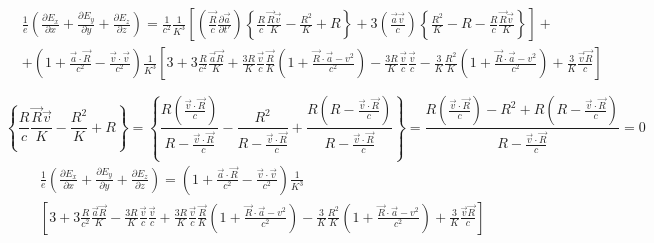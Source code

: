 \documentclass[11pt]{article}
\begin{document}
\[\begin{align}
  & \frac{1}{e}\left( \frac{\partial {{E}_{x}}}{\partial x}+\frac{\partial {{E}_{y}}}{\partial y}+\frac{\partial {{E}_{z}}}{\partial z} \right)=\frac{1}{{{c}^{2}}}\frac{1}{{{K}^{3}}}\left[ \left( \frac{\overrightarrow{R}}{c}\frac{\partial \overrightarrow{a}}{\partial t'} \right)\left\{ \frac{R}{c}\frac{\overrightarrow{R}\overrightarrow{v}}{K}-\frac{{{R}^{2}}}{K}+R \right\}+3\left( \frac{\overrightarrow{a}\overrightarrow{v}}{c} \right)\left\{ \frac{{{R}^{2}}}{K}-R-\frac{R}{c}\frac{\overrightarrow{R}\overrightarrow{v}}{K} \right\} \right]+ \\ 
 & +\left( 1+\frac{\overrightarrow{a}\cdot \overrightarrow{R}}{{{c}^{2}}}-\frac{\overrightarrow{v}\cdot \overrightarrow{v}}{{{c}^{2}}} \right)\frac{1}{{{K}^{3}}}\left[ 3+3\frac{R}{{{c}^{2}}}\frac{\overrightarrow{a}\overrightarrow{R}}{K}+\frac{3R}{K}\frac{\overrightarrow{v}}{c}\frac{\overrightarrow{R}}{K}\left( 1+\frac{\overrightarrow{R}\cdot \overrightarrow{a}-{{v}^{2}}}{{{c}^{2}}} \right)-\frac{3R}{K}\frac{\overrightarrow{v}}{c}\frac{\overrightarrow{v}}{c}-\frac{3}{K}\frac{{{R}^{2}}}{K}\left( 1+\frac{\overrightarrow{R}\cdot \overrightarrow{a}-{{v}^{2}}}{{{c}^{2}}} \right)+\frac{3}{K}\frac{\overrightarrow{v}\overrightarrow{R}}{c} \right] \\ 
 &  \\ 
\end{align}\]
\[\left\{ \frac{R}{c}\frac{\overrightarrow{R}\overrightarrow{v}}{K}-\frac{{{R}^{2}}}{K}+R \right\}=\left\{ \frac{R\left( \frac{\overrightarrow{v}\cdot \overrightarrow{R}}{c} \right)}{R-\frac{\overrightarrow{v}\cdot \overrightarrow{R}}{c}}-\frac{{{R}^{2}}}{R-\frac{\overrightarrow{v}\cdot \overrightarrow{R}}{c}}+\frac{R\left( R-\frac{\overrightarrow{v}\cdot \overrightarrow{R}}{c} \right)}{R-\frac{\overrightarrow{v}\cdot \overrightarrow{R}}{c}} \right\}=\frac{R\left( \frac{\overrightarrow{v}\cdot \overrightarrow{R}}{c} \right)-{{R}^{2}}+R\left( R-\frac{\overrightarrow{v}\cdot \overrightarrow{R}}{c} \right)}{R-\frac{\overrightarrow{v}\cdot \overrightarrow{R}}{c}}=0\]
\[\begin{align}
  & \frac{1}{e}\left( \frac{\partial {{E}_{x}}}{\partial x}+\frac{\partial {{E}_{y}}}{\partial y}+\frac{\partial {{E}_{z}}}{\partial z} \right)=\left( 1+\frac{\overrightarrow{a}\cdot \overrightarrow{R}}{{{c}^{2}}}-\frac{\overrightarrow{v}\cdot \overrightarrow{v}}{{{c}^{2}}} \right)\frac{1}{{{K}^{3}}} \\ 
 & \left[ 3+3\frac{R}{{{c}^{2}}}\frac{\overrightarrow{a}\overrightarrow{R}}{K}-\frac{3R}{K}\frac{\overrightarrow{v}}{c}\frac{\overrightarrow{v}}{c}+\frac{3R}{K}\frac{\overrightarrow{v}}{c}\frac{\overrightarrow{R}}{K}\left( 1+\frac{\overrightarrow{R}\cdot \overrightarrow{a}-{{v}^{2}}}{{{c}^{2}}} \right)-\frac{3}{K}\frac{{{R}^{2}}}{K}\left( 1+\frac{\overrightarrow{R}\cdot \overrightarrow{a}-{{v}^{2}}}{{{c}^{2}}} \right)+\frac{3}{K}\frac{\overrightarrow{v}\overrightarrow{R}}{c} \right] \\ 
\end{align}\]
\end{document}

